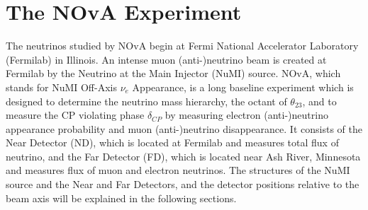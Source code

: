 \chapter{The NOvA Experiment}
\label{experiment_chapter}

The neutrinos studied by NOvA begin at Fermi National Accelerator Laboratory (Fermilab) 
in Illinois.  An intense muon (anti-)neutrino beam is created at Fermilab by the Neutrino 
at the Main Injector (NuMI) source. NOvA, which stands for NuMI Off-Axis $\nu_e$ Appearance, 
is a long baseline experiment which is designed to determine the neutrino mass hierarchy, 
the octant of $\theta_{23}$, and to measure the CP violating phase $\delta_{CP}$ by measuring 
electron (anti-)neutrino appearance probability and muon (anti-)neutrino disappearance. It 
consists of the Near Detector (ND), which is located at Fermilab and measures total flux of 
neutrino, and the Far Detector (FD), which is located near Ash River, Minnesota and measures 
flux of muon and electron neutrinos. The structures of the NuMI source and the Near and 
Far Detectors, and the detector positions relative to the beam axis will be explained in 
the following sections.

